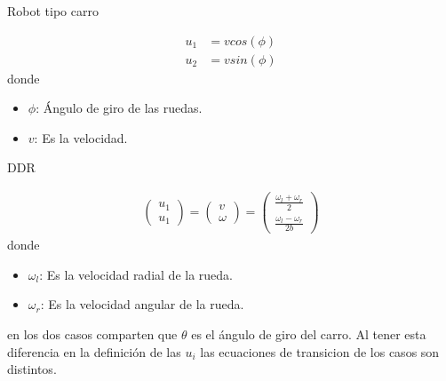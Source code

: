 \begin{minipage}{0.5\linewidth}
    \begin{center}
        Robot tipo carro
    \end{center}
    \begin{align*}
        u_1 & = vcos(\phi) \\
        u_2 & = vsin(\phi)
    \end{align*}
    donde
    \begin{itemize}
        \item $\phi$: Ángulo de giro de las ruedas.
        \item $v$: Es la velocidad.
    \end{itemize}
\end{minipage}
\begin{minipage}{0.5\linewidth}
    \begin{center}
        DDR
    \end{center}
    \begin{align*}
        \begin{pmatrix}
            u_1 \\
            u_1
        \end{pmatrix} = \begin{pmatrix}
            v \\
            \omega
        \end{pmatrix} = \begin{pmatrix}
            \frac{\omega_l+\omega_r}{2} \\
            \frac{\omega_l-\omega_r}{2b}
        \end{pmatrix}
    \end{align*}
    donde
    \begin{itemize}
        \item $\omega_l$: Es la velocidad radial de la rueda.
        \item $\omega_r$: Es la velocidad angular de la rueda.
    \end{itemize}
\end{minipage}
en los dos casos comparten que $\theta$ es el ángulo de giro del carro. Al tener esta diferencia en la definición de las $u_i$ las ecuaciones de transicion de los casos son distintos.